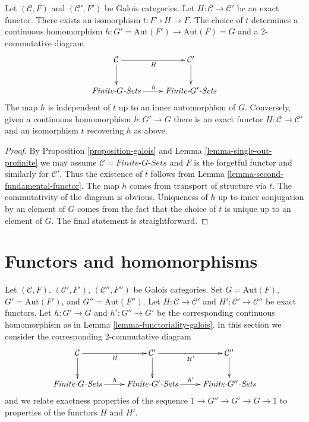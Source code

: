 \begin{lemma}
\label{lemma-functoriality-galois}
Let $(\mathcal{C}, F)$ and $(\mathcal{C}', F')$ be Galois categories.
Let $H : \mathcal{C} \to \mathcal{C}'$ be an exact functor.
There exists an isomorphism $t : F' \circ H \to F$.
The choice of $t$ determines a continuous homomorphism
$h : G' = \text{Aut}(F') \to \text{Aut}(F) = G$ and
a $2$-commutative diagram
$$
\xymatrix{
\mathcal{C} \ar[r]_H \ar[d] & \mathcal{C}' \ar[d] \\
\textit{Finite-}G\textit{-Sets} \ar[r]^h &
\textit{Finite-}G'\textit{-Sets}
}
$$
The map $h$ is independent of $t$ up
to an inner automorphism of $G$.
Conversely, given a continuous homomorphism $h : G' \to G$ there
is an exact functor $H : \mathcal{C} \to \mathcal{C}'$ and an
isomorphism $t$ recovering $h$ as above.
\end{lemma}

\begin{proof}
By Proposition \ref{proposition-galois} and
Lemma \ref{lemma-single-out-profinite} we may assume
$\mathcal{C} = \textit{Finite-}G\textit{-Sets}$ and $F$ is the
forgetful functor and similarly for $\mathcal{C}'$. Thus the existence of
$t$ follows from Lemma \ref{lemma-second-fundamental-functor}. The map $h$
comes from transport of structure via $t$. The commutativity of the
diagram is obvious. Uniqueness of $h$ up to inner conjugation by
an element of $G$ comes from the fact that the choice of $t$ is
unique up to an element of $G$. The final statement is straightforward.
\end{proof}





\section{Functors and homomorphisms}
\label{section-translation}

\noindent
Let $(\mathcal{C}, F)$, $(\mathcal{C}', F')$, $(\mathcal{C}'', F'')$
be Galois categories. Set $G = \text{Aut}(F)$, $G' = \text{Aut}(F')$, and
$G'' = \text{Aut}(F'')$. Let $H : \mathcal{C} \to \mathcal{C}'$
and $H' : \mathcal{C}' \to \mathcal{C}''$ be exact functors.
Let $h : G' \to G$ and $h' : G'' \to G'$ be the corresponding
continuous homomorphism as in Lemma \ref{lemma-functoriality-galois}.
In this section we consider the corresponding $2$-commutative diagram
\begin{equation}
\label{equation-translation}
\vcenter{
\xymatrix{
\mathcal{C} \ar[r]_H \ar[d] &
\mathcal{C}' \ar[r]_{H'} \ar[d] &
\mathcal{C}'' \ar[d] \\
\textit{Finite-}G\textit{-Sets} \ar[r]^h &
\textit{Finite-}G'\textit{-Sets} \ar[r]^{h'} &
\textit{Finite-}G''\textit{-Sets}
}
}
\end{equation}
and we relate exactness properties of the sequence
$1 \to G'' \to G' \to G \to 1$ to properties of the functors $H$ and $H'$.

